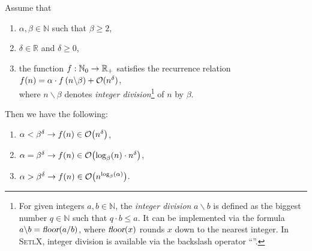 \begin{Theorem} 
  Assume that 
  \begin{enumerate}
  \item $\alpha,\beta \in \mathbb{N}$ such that  $\beta \geq 2$,
  \item $\delta \in \mathbb{R}$ and $\delta \geq 0$,
  \item the function $f:{\mathbb N}_0 \rightarrow {\mathbb R}_+$ satisfies the recurrence relation
        \\[0.2cm]
        \hspace*{1.3cm}
        $f(n) = \alpha \cdot f\left(n \backslash \beta\right) + \mathcal{O}(n^\delta)$,
        \\[0.2cm]
        where $n \backslash \beta$ denotes \emph{integer division}\footnote{
          For given integers $a, b \in \mathbb{N}$, the \emph{integer division} $a \backslash b$
          is defined as the biggest number $q \in \mathbb{N}$ such that $q \cdot b \leq a$.  It can
          be implemented via the formula $a \backslash b = \textsl{floor}(a/b)$, where
          $\textsl{floor}(x)$ rounds $x$ down to the nearest integer.  In \textsc{SetlX}, integer
          division is available via the backslash operator ``\texttt{}''.
        }  
        of $n$ by $\beta$.
  \end{enumerate}
  Then we have the following:
  \begin{enumerate}
  \item $\alpha < \beta^\delta\rightarrow f(n) \in \mathcal{O}\bigl(n^{\delta}\bigr)$,
  \item $\alpha = \beta^\delta\rightarrow f(n) \in \mathcal{O}\bigl(\log_\beta(n) \cdot n^{\delta}\bigr)$,
  \item $\alpha > \beta^{\delta} \rightarrow f(n) \in \mathcal{O}\bigl(n^{\log_{\beta}(\alpha)}\bigr)$. 
  \end{enumerate}
\end{Theorem}


